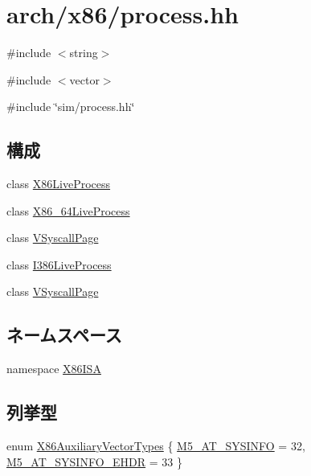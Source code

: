 \hypertarget{arch_2x86_2process_8hh}{
\section{arch/x86/process.hh}
\label{arch_2x86_2process_8hh}
}
{\ttfamily \#include $<$string$>$}\par
{\ttfamily \#include $<$vector$>$}\par
{\ttfamily \#include \char`\"{}sim/process.hh\char`\"{}}\par
\subsection*{構成}
\begin{DoxyCompactItemize}
\item 
class \hyperlink{classX86ISA_1_1X86LiveProcess}{X86LiveProcess}
\item 
class \hyperlink{classX86ISA_1_1X86__64LiveProcess}{X86\_\-64LiveProcess}
\item 
class \hyperlink{classX86ISA_1_1X86__64LiveProcess_1_1VSyscallPage}{VSyscallPage}
\item 
class \hyperlink{classX86ISA_1_1I386LiveProcess}{I386LiveProcess}
\item 
class \hyperlink{classX86ISA_1_1I386LiveProcess_1_1VSyscallPage}{VSyscallPage}
\end{DoxyCompactItemize}
\subsection*{ネームスペース}
\begin{DoxyCompactItemize}
\item 
namespace \hyperlink{namespaceX86ISA}{X86ISA}
\end{DoxyCompactItemize}
\subsection*{列挙型}
\begin{DoxyCompactItemize}
\item 
enum \hyperlink{namespaceX86ISA_a220a5701eb61c9715f2a66aa880d30b9}{X86AuxiliaryVectorTypes} \{ \hyperlink{namespaceX86ISA_a220a5701eb61c9715f2a66aa880d30b9a39296c9be5af2ec4edc9830fa3da5ee4}{M5\_\-AT\_\-SYSINFO} =  32, 
\hyperlink{namespaceX86ISA_a220a5701eb61c9715f2a66aa880d30b9abd0818adabbd02d06de1065979ec4691}{M5\_\-AT\_\-SYSINFO\_\-EHDR} =  33
 \}
\end{DoxyCompactItemize}

